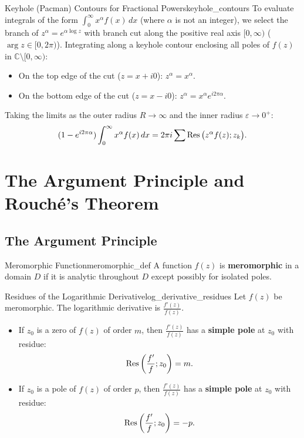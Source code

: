 \begin{proposition}{Keyhole (Pacman) Contours for Fractional Powers}{keyhole_contours}
To evaluate integrals of the form $\int_0^\infty x^\alpha f(x)\, dx$ (where $\alpha$ is not an integer), we select the branch of $z^\alpha = e^{\alpha \log z}$ with branch cut along the positive real axis $[0, \infty)$ ($\arg z \in [0, 2\pi)$).
Integrating along a keyhole contour enclosing all poles of $f(z)$ in $\mathbb{C} \setminus [0, \infty)$:
\begin{itemize}
    \item On the top edge of the cut ($z = x + i0$): $z^\alpha = x^\alpha$.
    \item On the bottom edge of the cut ($z = x - i0$): $z^\alpha = x^\alpha e^{i 2\pi\alpha}$.
\end{itemize}
Taking the limits as the outer radius $R \to \infty$ and the inner radius $\varepsilon \to 0^+$:
\begin{equation}
(1 - e^{i 2\pi\alpha}) \int_0^\infty x^\alpha f(x)\, dx = 2\pi i \sum \operatorname{Res}\big(z^\alpha f(z); z_k\big).
\end{equation}
\end{proposition}


\section{The Argument Principle and Rouché's Theorem}

\subsection{The Argument Principle}

\begin{definition}{Meromorphic Function}{meromorphic_def}
A function $f(z)$ is \textbf{meromorphic} in a domain $D$ if it is analytic throughout $D$ except possibly for isolated poles.
\end{definition}

\begin{proposition}{Residues of the Logarithmic Derivative}{log_derivative_residues}
Let $f(z)$ be meromorphic. The logarithmic derivative is $\frac{f'(z)}{f(z)}$.
\begin{itemize}
    \item If $z_0$ is a zero of $f(z)$ of order $m$, then $\frac{f'(z)}{f(z)}$ has a \textbf{simple pole} at $z_0$ with residue:
    \begin{equation}
    \operatorname{Res}\left(\frac{f'}{f}; z_0\right) = m.
    \end{equation}
    \item If $z_0$ is a pole of $f(z)$ of order $p$, then $\frac{f'(z)}{f(z)}$ has a \textbf{simple pole} at $z_0$ with residue:
    \begin{equation}
    \operatorname{Res}\left(\frac{f'}{f}; z_0\right) = -p.
    \end{equation}
\end{itemize}
\end{proposition}

